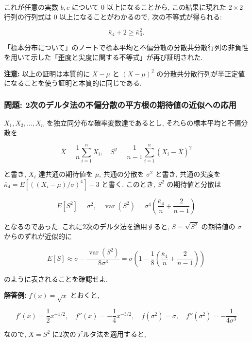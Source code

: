 \documentclass[10pt, a4paper,xelatex,ja=standard]{bxjsarticle}
\newcommand\op{\operatorname}
\newcommand\bk{\bar\kappa}
\begin{document}
これが任意の実数 \(b,c\) について \(0\) 以上になることから,
この結果に現れた \(2\times 2\) 行列の行列式は \(0\)
以上になることがわかるので, 次の不等式が得られる:

\[
\bk_4 + 2 \ge \bk_3^2.
\]

「標本分布について」のノートで標本平均と不偏分散の分散共分散行列の非負性を用いて示した「歪度と尖度に関する不等式」が再び証明された.

\textbf{注意:} 以上の証明は本質的に \(X-\mu\) と \((X-\mu)^2\)
の分散共分散行列が半正定値になることを使う証明と本質的に同じである.

    \hypertarget{ux554fux984c-2ux6b21ux306eux30c7ux30ebux30bfux6cd5ux306eux4e0dux504fux5206ux6563ux306eux5e73ux65b9ux6839ux306eux671fux5f85ux5024ux306eux8fd1ux4f3cux3078ux306eux5fdcux7528}{%
\subsubsection{問題:
2次のデルタ法の不偏分散の平方根の期待値の近似への応用}\label{ux554fux984c-2ux6b21ux306eux30c7ux30ebux30bfux6cd5ux306eux4e0dux504fux5206ux6563ux306eux5e73ux65b9ux6839ux306eux671fux5f85ux5024ux306eux8fd1ux4f3cux3078ux306eux5fdcux7528}}

\(X_1,X_2,\ldots,X_n\) を独立同分布な確率変数達であるとし,
それらの標本平均と不偏分散を

\[
\bar{X} = \frac{1}{n}\sum_{i=1}^n X_i, \quad
S^2 = \frac{1}{n-1}\sum_{i=1}^n(X_i - \bar{X})^2
\]

と書き, \(X_i\) 達共通の期待値を \(\mu\), 共通の分散を \(\sigma^2\)
と書き, 共通の尖度を \(\bk_4 = E[((X_i-\mu)/\sigma)^4]-3\) と書く.
このとき, \(S^2\) の期待値と分散は

\[
E[S^2] = \sigma^2, \quad
\op{var}(S^2) = \sigma^4\left(\frac{\bk_4}{n} + \frac{2}{n-1}\right)
\]

となるのであった. これに2次のデルタ法を適用すると, \(S = \sqrt{S^2}\)
の期待値の \(\sigma\) からのずれが近似的に

\[
E[S] \approx
\sigma - \frac{\op{var}(S^2)}{8\sigma^3} =
\sigma\left(1 - \frac{1}{8}\left(\frac{\bk_4}{n} + \frac{2}{n-1}\right)\right)
\]

のように表されることを確認せよ.

\textbf{解答例:} \(f(x) = \sqrt{x}\) とおくと,

\[
f'(x) = \frac{1}{2}x^{-1/2}, \quad
f''(x) = -\frac{1}{4}x^{-3/2}, \quad
f(\sigma^2) = \sigma,  \quad
f''(\sigma^2) = -\frac{1}{4\sigma^3}
\]

なので, \(X = S^2\) に2次のデルタ法を適用すると,
\end{document}
